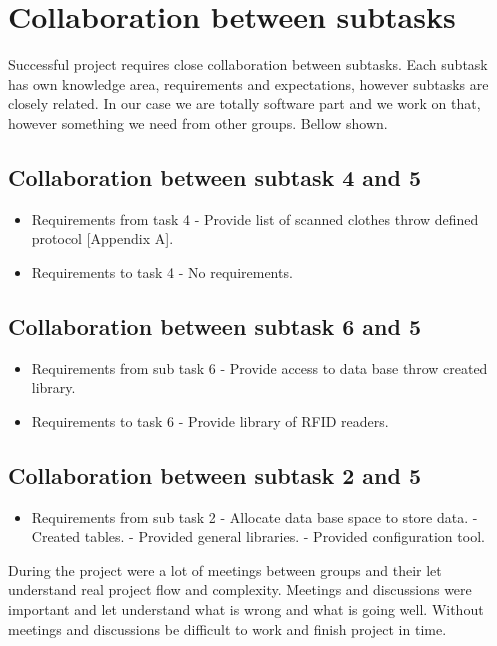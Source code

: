 %
\section{Collaboration between subtasks}

Successful project requires close collaboration between subtasks. Each subtask has own knowledge area, requirements and expectations, however subtasks are closely related. In our case we are totally software part and we work on that, however something we need from other groups. Bellow shown.

\subsection{Collaboration between subtask 4 and 5}
\begin{itemize}
	\item Requirements from task 4
	\subitem - Provide list of scanned clothes throw defined protocol [Appendix A].
	\item Requirements to task 4
	\subitem - No requirements.
\end{itemize}

\subsection{Collaboration between subtask 6 and 5}
\begin{itemize}
	\item Requirements from sub task 6
	\subitem - Provide access to data base throw created library.
	\item Requirements to task 6
	\subitem - Provide library of RFID readers.
\end{itemize}

\subsection{Collaboration between subtask 2 and 5}
\begin{itemize}
	\item Requirements from sub task 2
	\subitem - Allocate data base space to store data.
	\subitem - Created tables.
	\subitem - Provided general libraries.
	\subitem - Provided configuration tool.
\end{itemize}

During the project were a lot of meetings between groups and their let understand real project flow and complexity. Meetings and discussions were important and let understand what is wrong and what is going well.  Without meetings and discussions be difficult to work and finish project in time. 